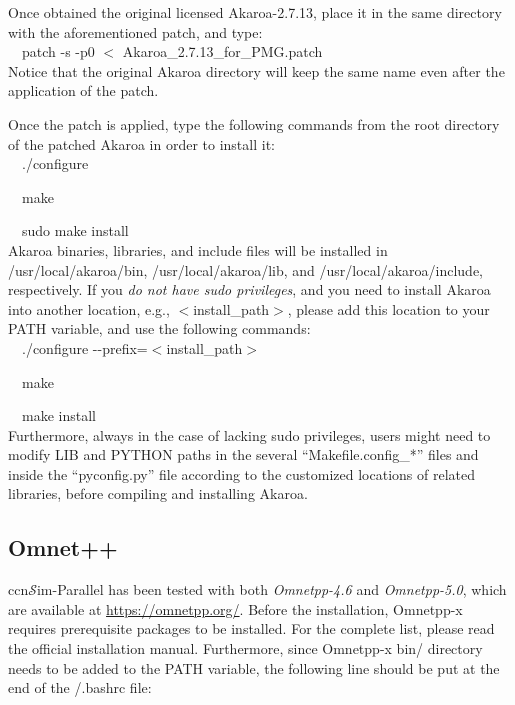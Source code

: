 \documentclass[10pt]{article}
\newcommand{\ccnsim}{ccn\ensuremath{\mathcal{S}}im} %
\newcommand{\textapprox}{\raisebox{0.5ex}{\texttildelow}}
\newcommand{\colorboxg}[1]{{\colorbox{gray!20}{#1}}}
\begin{document}
Once obtained the original licensed Akaroa-2.7.13, place it in the same directory with the aforementioned patch, and type: \\

\ \ \colorboxg{patch -s -p0 $<$ Akaroa\_2.7.13\_for\_PMG.patch} \\

Notice that the original Akaroa directory will keep the same name even after the application of the patch.

Once the patch is applied, type the following commands from the root directory of the patched Akaroa in order to install it: \\

\ \ \colorboxg{./configure} 

\ \ \colorboxg{make} 

\ \ \colorboxg{sudo make install} \\

Akaroa binaries, libraries, and include files will be installed in /usr/local/akaroa/bin, /usr/local/akaroa/lib, and /usr/local/akaroa/include, respectively.
If you \emph{do not have sudo privileges}, and you need to install Akaroa into another location, e.g., $<$install\_path$>$, please add this location to your PATH variable, and use the following commands: \\

\ \ \colorboxg{./configure -{}-prefix=$<$install\_path$>$} 

\ \ \colorboxg{make} 

\ \ \colorboxg{make install} \\

Furthermore, always in the case of lacking sudo privileges, users might need to modify LIB and PYTHON paths in the several ``Makefile.config\_*'' files and inside the ``pyconfig.py'' file according to the customized locations of related libraries, before compiling and installing Akaroa.


\subsection*{Omnet++}
\ccnsim-Parallel has been tested with both \emph{Omnetpp-4.6} and \emph{Omnetpp-5.0}, which are available at \url{https://omnetpp.org/}. 
Before the installation, Omnetpp-x requires prerequisite packages to be installed. For the complete list, please read the official installation manual. 
Furthermore, since Omnetpp-x bin/ directory needs to be added to the PATH variable, the following line should be put at the end of the \colorboxg{\textapprox/.bashrc} file: \\ 
\end{document}
